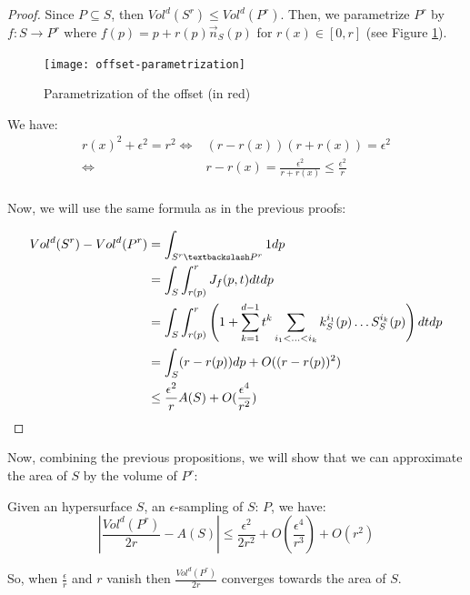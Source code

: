 \begin{proof}
    Since $ P \subseteq S $, then $ Vol^d(S^r) \leq Vol^d(P^r) $. Then, we
    parametrize $ P^r $ by $ f : S \to P^r $ where $ f(p) = p + r(p)
    \vec{n}_S(p) $ for $ r(x) \in [0, r] $ (see Figure
    \ref{fig:offset-parametrization}).

    \begin{figure}[h]
        \centering
        \texttt{[image: offset-parametrization]}
        \caption{Parametrization of the offset (in red)}
        \label{fig:offset-parametrization}
    \end{figure}

    We have:
    \begin{align*}
        r(x)^2 + \epsilon^2 = r^2 \iff& (r - r(x)) (r + r(x)) = \epsilon^2 \\
        \iff& r - r(x) = \frac{\epsilon^2}{r + r(x)} \leq \frac{\epsilon^2}{r} \\
    \end{align*}

    Now, we will use the same formula as in the previous proofs:

    \begin{align*}
        Vol^d(S^r) - Vol^d(P^r) &= \int_{S^r \textbackslash P^r} 1 dp \\
        &= \int_S \int_{r(p)}^r J_f(p, t) dt dp \\
        &= \int_S \int_{r(p)}^r \left( 1 + \sum_{k=1}^{d-1} t^k \sum_{i_1 < \ldots
                < i_k} k^{i_1}_S(p) \ldots S^{i_k}_S(p) \right) dt dp \\
        &= \int_S (r - r(p)) dp + O((r - r(p))^2) \\
        &\leq \frac{\epsilon^2}{r} A(S) + O(\frac{\epsilon^4}{r^2})
    \end{align*}
\end{proof}

Now, combining the previous propositions, we will show that we can approximate
the area of $ S $ by the volume of $ P^r $:

\begin{proposition}
    \label{prop:approx-volume-area}
    Given an hypersurface $ S $, an $\epsilon$-sampling of $ S $: $ P $, we
    have:
    \begin{equation}
        | \frac{Vol^d(P^r)}{2r} - A(S) | \leq \frac{\epsilon^2}{2r^2} +
        O(\frac{\epsilon^4}{r^3}) + O(r^2)
    \end{equation}

    So, when $ \frac{\epsilon}{r} $ and $ r $ vanish then $
    \frac{Vol^d(P^r)}{2r} $ converges towards the area of $ S $.
\end{proposition}

